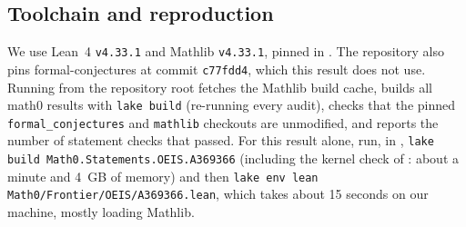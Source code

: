 \documentclass[11pt]{amsart}
\theoremstyle{plain}
\theoremstyle{definition}
\begin{document}
\subsection*{Toolchain and reproduction}
We use Lean~4 \cite{Lean4} \texttt{v4.33.1} and Mathlib \cite{Mathlib} \texttt{v4.33.1}, pinned in . The repository also pins formal-conjectures \cite{FC} at commit \texttt{c77fdd4}, which this result does not use. Running  from the repository root fetches the Mathlib build cache, builds all math0 results with \texttt{lake build} (re-running every audit), checks that the pinned \texttt{formal\_conjectures} and \texttt{mathlib} checkouts are unmodified, and reports the number of statement checks that passed. For this result alone, run, in , \texttt{lake build Math0.Statements.OEIS.A369366} (including the kernel check of : about a minute and 4~GB of memory) and then \texttt{lake env lean Math0/Frontier/OEIS/A369366.lean}, which takes about 15 seconds on our machine, mostly loading Mathlib.
\end{document}
